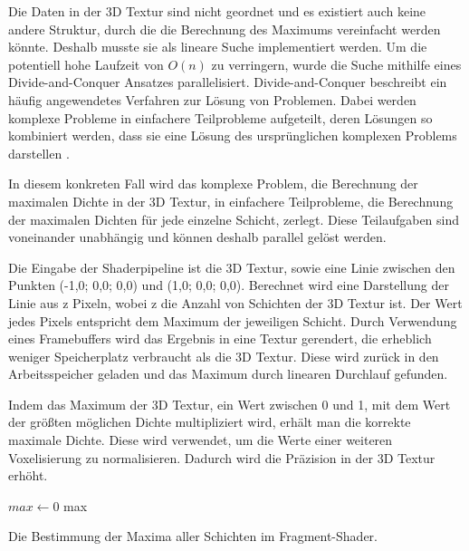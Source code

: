 \documentclass[a4paper,fontsize=12pt,toc=bib,parskip=half,ngerman]{scrartcl}
\begin{document}
Die Daten in der 3D Textur sind nicht geordnet und es existiert auch keine andere Struktur, durch die die Berechnung des Maximums vereinfacht werden k\"onnte. Deshalb musste sie als lineare Suche implementiert werden. Um die potentiell hohe Laufzeit von $O(n)$ zu verringern, wurde die Suche  mithilfe eines \glq Divide-and-Conquer\grq{} Ansatzes parallelisiert. Divide-and-Conquer beschreibt ein h\"aufig angewendetes Verfahren zur L\"osung von Problemen. Dabei werden komplexe Probleme in einfachere Teilprobleme aufgeteilt, deren L\"osungen so kombiniert werden, dass sie eine L\"osung des urspr\"unglichen komplexen Problems darstellen \cite{jordan1994hierarchical}.

In diesem konkreten Fall wird das komplexe Problem, die Berechnung der maximalen Dichte in der 3D Textur, in einfachere Teilprobleme, die Berechnung der maximalen Dichten f\"ur jede einzelne Schicht, zerlegt. Diese Teilaufgaben sind voneinander unabh\"angig und k\"onnen deshalb parallel gel\"ost werden.

Die Eingabe der Shaderpipeline ist die 3D Textur, sowie eine Linie zwischen den Punkten (-1,0; 0,0; 0,0) und (1,0; 0,0; 0,0). Berechnet wird eine Darstellung der Linie aus z Pixeln, wobei z die Anzahl von Schichten der 3D Textur ist. Der Wert jedes Pixels entspricht dem Maximum der jeweiligen Schicht. Durch Verwendung eines Framebuffers wird das Ergebnis in eine Textur gerendert, die erheblich weniger Speicherplatz verbraucht als die 3D Textur. Diese wird zur\"uck in den Arbeitsspeicher geladen und das Maximum durch linearen Durchlauf gefunden.

Indem das Maximum der 3D Textur, ein Wert zwischen 0 und 1, mit dem Wert der gr\"o{\ss}ten m\"oglichen Dichte multipliziert wird, erh\"alt man die korrekte maximale Dichte. Diese wird verwendet, um die Werte einer weiteren Voxelisierung zu normalisieren. Dadurch wird die Pr\"azision in der 3D Textur erh\"oht.

\begin{algorithm}
	
	$max \gets 0$\;
	\Return max\;
	\vspace{0.5cm}
	\caption{Die Bestimmung der Maxima aller Schichten im Fragment-Shader.}
	\label{MaximumAlgo}
\end{algorithm}
\end{document}
